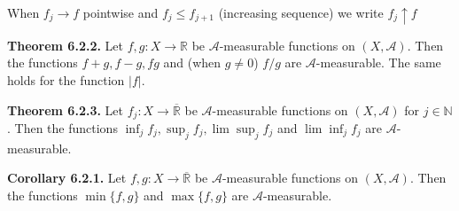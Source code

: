 \documentclass[a4paper,14pt]{extarticle}
\theoremstyle{definition}
\begin{document}
When $f_j\rightarrow f$ pointwise and $f_j\leq f_{j+1}$ (increasing sequence) we write $f_j\uparrow f$

\vspace{12pt}

\noindent\textbf{Theorem 6.2.2.} Let $f,g:X\rightarrow\mathbb{R}$ be $\mathcal{A}$-measurable functions on $(X,\mathcal{A})$. Then the functions $f+g,f-g,fg$ and (when $g\neq0$) $f/g$ are $\mathcal{A}$-measurable. The same holds for the function $|f|$.

\vspace{12pt}

\noindent\textbf{Theorem 6.2.3.} Let $f_j:X\rightarrow\overline{\mathbb{R}}$ be $\mathcal{A}$-measurable functions on $(X,\mathcal{A})$ for $j\in\mathbb{N}$. Then the functions $\inf_j f_j,\sup_j f_j,\lim\sup_j f_j$ and $\lim\inf_j f_j$ are $\mathcal{A}$-measurable.

\vspace{12pt}

\noindent\textbf{Corollary 6.2.1.} Let $f,g:X\rightarrow\overline{\mathbb{R}}$ be $\mathcal{A}$-measurable functions on $(X,\mathcal{A})$. Then the functions $\min\{f,g\}$ and $\max\{f,g\}$ are $\mathcal{A}$-measurable.
\newpage
\end{document}

